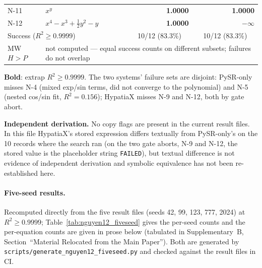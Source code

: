 \documentclass[twoside,11pt]{article}
\newcommand{\Rsq}{R^{2}}
\begin{document}
\begin{table}[h]
\begin{threeparttable}
\begin{tabular}{llrr}
N-11 & $x^y$                                         & \textbf{1.0000} & \textbf{1.0000} \\
N-12 & $x^4 - x^3 + \tfrac{1}{2}y^2 - y$              & \textbf{1.0000} & $-\infty$ \\
\midrule
\multicolumn{2}{l}{Success ($\Rsq\ge0.9999$)}
  & \multicolumn{1}{c}{10/12 (83.3\%)}
  & \multicolumn{1}{c}{10/12 (83.3\%)} \\
MW $H>P$   & \multicolumn{3}{l}{not computed --- equal success counts on different subsets; failures do not overlap} \\
\bottomrule
\end{tabular}
\begin{tablenotes}\small
  \item \textbf{Bold}: extrap $\Rsq \ge 0.9999$. The two systems' failure sets are
    disjoint: PySR-only misses N-4 (mixed exp/sin terms, did not converge to the
    polynomial) and N-5 (nested cos/sin fit, $\Rsq=0.156$); HypatiaX misses N-9
    and N-12, both by gate abort.
  \item[$\ddag$] \textbf{Independent derivation.} No copy flags are present in the current
    result files. In this file HypatiaX's stored expression differs textually from
    PySR-only's on the 10 records where the search ran (on the two gate aborts, N-9 and
    N-12, the stored value is the placeholder string \texttt{FAILED}), but textual difference is not evidence of
    independent derivation and symbolic equivalence has not been re-established here.
\end{tablenotes}
\end{threeparttable}
\end{table}

\paragraph{Five-seed results.} Recomputed directly from the
five result files (seeds 42, 99, 123, 777, 2024) at $\Rsq\ge0.9999$;
Table~\ref{tab:nguyen12_fiveseed} gives the per-seed counts and
the per-equation counts are given in prose below (tabulated in Supplementary~B, Section~``Material Relocated from the Main Paper''). Both are generated by
\texttt{scripts/generate\_nguyen12\_fiveseed.py} and checked against the result files in CI.
\end{document}
